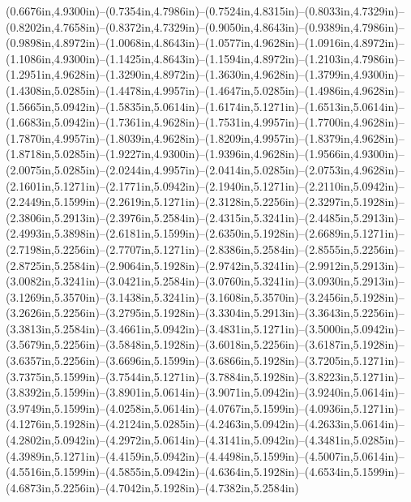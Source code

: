 (0.6676in,4.9300in)--(0.7354in,4.7986in)--(0.7524in,4.8315in)--(0.8033in,4.7329in)--(0.8202in,4.7658in)--(0.8372in,4.7329in)--(0.9050in,4.8643in)--(0.9389in,4.7986in)--(0.9898in,4.8972in)--(1.0068in,4.8643in)--(1.0577in,4.9628in)--(1.0916in,4.8972in)--(1.1086in,4.9300in)--(1.1425in,4.8643in)--(1.1594in,4.8972in)--(1.2103in,4.7986in)--(1.2951in,4.9628in)--(1.3290in,4.8972in)--(1.3630in,4.9628in)--(1.3799in,4.9300in)--(1.4308in,5.0285in)--(1.4478in,4.9957in)--(1.4647in,5.0285in)--(1.4986in,4.9628in)--(1.5665in,5.0942in)--(1.5835in,5.0614in)--(1.6174in,5.1271in)--(1.6513in,5.0614in)--(1.6683in,5.0942in)--(1.7361in,4.9628in)--(1.7531in,4.9957in)--(1.7700in,4.9628in)--(1.7870in,4.9957in)--(1.8039in,4.9628in)--(1.8209in,4.9957in)--(1.8379in,4.9628in)--(1.8718in,5.0285in)--(1.9227in,4.9300in)--(1.9396in,4.9628in)--(1.9566in,4.9300in)--(2.0075in,5.0285in)--(2.0244in,4.9957in)--(2.0414in,5.0285in)--(2.0753in,4.9628in)--(2.1601in,5.1271in)--(2.1771in,5.0942in)--(2.1940in,5.1271in)--(2.2110in,5.0942in)--(2.2449in,5.1599in)--(2.2619in,5.1271in)--(2.3128in,5.2256in)--(2.3297in,5.1928in)--(2.3806in,5.2913in)--(2.3976in,5.2584in)--(2.4315in,5.3241in)--(2.4485in,5.2913in)--(2.4993in,5.3898in)--(2.6181in,5.1599in)--(2.6350in,5.1928in)--(2.6689in,5.1271in)--(2.7198in,5.2256in)--(2.7707in,5.1271in)--(2.8386in,5.2584in)--(2.8555in,5.2256in)--(2.8725in,5.2584in)--(2.9064in,5.1928in)--(2.9742in,5.3241in)--(2.9912in,5.2913in)--(3.0082in,5.3241in)--(3.0421in,5.2584in)--(3.0760in,5.3241in)--(3.0930in,5.2913in)--(3.1269in,5.3570in)--(3.1438in,5.3241in)--(3.1608in,5.3570in)--(3.2456in,5.1928in)--(3.2626in,5.2256in)--(3.2795in,5.1928in)--(3.3304in,5.2913in)--(3.3643in,5.2256in)--(3.3813in,5.2584in)--(3.4661in,5.0942in)--(3.4831in,5.1271in)--(3.5000in,5.0942in)--(3.5679in,5.2256in)--(3.5848in,5.1928in)--(3.6018in,5.2256in)--(3.6187in,5.1928in)--(3.6357in,5.2256in)--(3.6696in,5.1599in)--(3.6866in,5.1928in)--(3.7205in,5.1271in)--(3.7375in,5.1599in)--(3.7544in,5.1271in)--(3.7884in,5.1928in)--(3.8223in,5.1271in)--(3.8392in,5.1599in)--(3.8901in,5.0614in)--(3.9071in,5.0942in)--(3.9240in,5.0614in)--(3.9749in,5.1599in)--(4.0258in,5.0614in)--(4.0767in,5.1599in)--(4.0936in,5.1271in)--(4.1276in,5.1928in)--(4.2124in,5.0285in)--(4.2463in,5.0942in)--(4.2633in,5.0614in)--(4.2802in,5.0942in)--(4.2972in,5.0614in)--(4.3141in,5.0942in)--(4.3481in,5.0285in)--(4.3989in,5.1271in)--(4.4159in,5.0942in)--(4.4498in,5.1599in)--(4.5007in,5.0614in)--(4.5516in,5.1599in)--(4.5855in,5.0942in)--(4.6364in,5.1928in)--(4.6534in,5.1599in)--(4.6873in,5.2256in)--(4.7042in,5.1928in)--(4.7382in,5.2584in)
